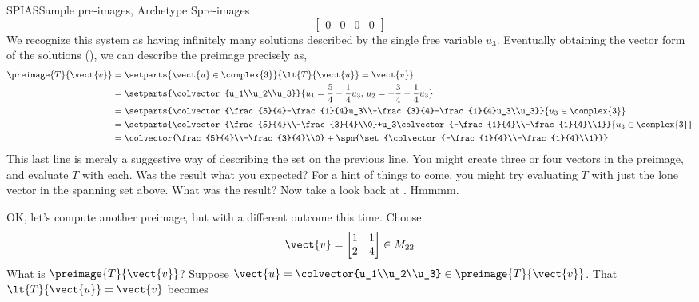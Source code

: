 \begin{example}{SPIAS}{Sample pre-images, Archetype S}{pre-images}
\begin{equation*}
\begin{bmatrix}
0 & 0 & 0 &  0
\end{bmatrix}
\end{equation*}
%
We recognize this system as having infinitely many solutions described by the single free variable $u_3$.  Eventually obtaining the vector form of the solutions (), we can describe the preimage precisely as,
%
\begin{align*}
\preimage{T}{\vect{v}}&=\setparts{\vect{u}\in\complex{3}}{\lt{T}{\vect{u}}=\vect{v}}\\
&=\setparts{\colvector{u_1\\u_2\\u_3}}{u_1=\frac{5}{4}-\frac{1}{4}u_3,\,u_2=-\frac{3}{4}-\frac{1}{4}u_3}\\
&=\setparts{\colvector{\frac{5}{4}-\frac{1}{4}u_3\\-\frac{3}{4}-\frac{1}{4}u_3\\u_3}}{u_3\in\complex{3}}\\
&=\setparts{\colvector{\frac{5}{4}\\-\frac{3}{4}\\0}+u_3\colvector{-\frac{1}{4}\\-\frac{1}{4}\\1}}{u_3\in\complex{3}}\\
&=\colvector{\frac{5}{4}\\-\frac{3}{4}\\0}+\spn{\set{\colvector{-\frac{1}{4}\\-\frac{1}{4}\\1}}}
\end{align*}
%
This last line is merely a suggestive way of describing the set on the previous line.  You might create three or four vectors in the preimage, and evaluate $T$ with each.  Was the result what you expected?  For a hint of things to come, you might try evaluating $T$ with just the lone vector in the spanning set above.  What was the result?  Now take a look back at .  Hmmmm.\par
%
OK, let's compute another preimage, but with a different outcome this time.  
Choose 
%
\begin{equation*}
\vect{v}=
\begin{bmatrix}
1&1\\2&4
\end{bmatrix}
\in M_{22}
\end{equation*}
%
What is $\preimage{T}{\vect{v}}$?  Suppose $\vect{u}=\colvector{u_1\\u_2\\u_3}\in\preimage{T}{\vect{v}}$.  That $\lt{T}{\vect{u}}=\vect{v}$ becomes

\end{example}
